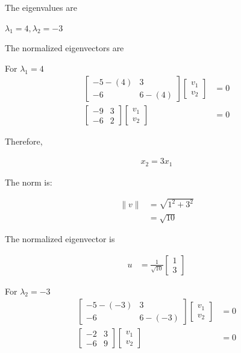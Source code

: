 \documentclass[11pt,letterpaper]{article}
\begin{document}
\begin{enumerate}
The eigenvalues are

\( \lambda_1 = 4, \lambda_2 = -3 \)

The normalized eigenvectors are

For \( \lambda_1 = 4 \)
\begin{align*}
    \begin{bmatrix}
        -5-(4) & 3 \\
        -6 & 6-(4)
    \end{bmatrix}
    \begin{bmatrix}
    v_1 \\ v_2
    \end{bmatrix} &= 0 \\
    \begin{bmatrix}
        -9 & 3 \\
        -6 & 2
    \end{bmatrix}
    \begin{bmatrix}
    v_1 \\ v_2
    \end{bmatrix} &= 0
\end{align*}

Therefore,

\begin{align*}
x_2 = 3x_1
\end{align*}

The norm is:

\begin{align*}
\lVert v \rVert &= \sqrt{1^2 + 3^2} \\
&= \sqrt{10}
\end{align*}

The normalized eigenvector is

\begin{align*}
u &= \frac{1}{\sqrt{10}} \begin{bmatrix} 1 \\ 3 \end{bmatrix}
\end{align*}

For \( \lambda_2 = -3 \)
\begin{align*}
    \begin{bmatrix}
        -5-(-3) & 3 \\
        -6 & 6-(-3)
    \end{bmatrix}
    \begin{bmatrix}
    v_1 \\ v_2
    \end{bmatrix} &= 0 \\
    \begin{bmatrix}
        -2 & 3 \\
        -6 & 9
    \end{bmatrix}
    \begin{bmatrix}
    v_1 \\ v_2
    \end{bmatrix} &= 0
\end{align*}


\end{enumerate}
\end{document}

